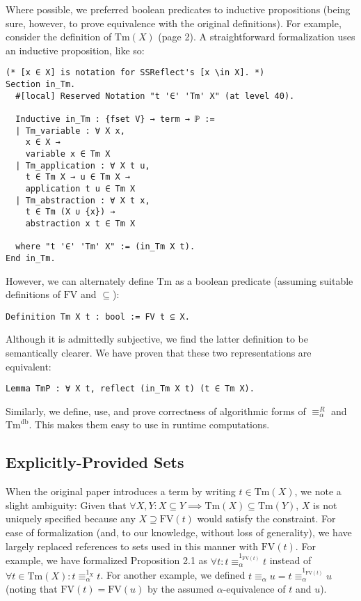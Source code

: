 \documentclass{article}
\begin{document}
Where possible, we preferred boolean predicates to inductive propositions (being sure, however, to
prove equivalence with the original definitions). For example, consider the definition of
$\textrm{Tm}(X)$ (page 2). A straightforward formalization uses an inductive proposition, like so:

\begin{verbatim}
(* [x ∈ X] is notation for SSReflect's [x \in X]. *)
Section in_Tm.
  #[local] Reserved Notation "t '∈' 'Tm' X" (at level 40).

  Inductive in_Tm : {fset V} → term → ℙ :=
  | Tm_variable : ∀ X x,
    x ∈ X →
    variable x ∈ Tm X
  | Tm_application : ∀ X t u,
    t ∈ Tm X → u ∈ Tm X →
    application t u ∈ Tm X
  | Tm_abstraction : ∀ X t x,
    t ∈ Tm (X ∪ {x}) →
    abstraction x t ∈ Tm X

  where "t '∈' 'Tm' X" := (in_Tm X t).
End in_Tm.
\end{verbatim}

However, we can alternately define $\textrm{Tm}$ as a boolean predicate (assuming suitable
definitions of $\textrm{FV}$ and $\subseteq$):

\begin{verbatim}
Definition Tm X t : bool := FV t ⊆ X.
\end{verbatim}

Although it is admittedly subjective, we find the latter definition to be semantically clearer. We
have proven that these two representations are equivalent:

\begin{verbatim}
Lemma TmP : ∀ X t, reflect (in_Tm X t) (t ∈ Tm X).
\end{verbatim}

Similarly, we define, use, and prove correctness of algorithmic forms of $\equiv_\alpha^R$ and
$\textrm{Tm}^{\textrm{db}}$. This makes them easy to use in runtime computations.

\subsection{Explicitly-Provided Sets}

When the original paper introduces a term by writing $t \in \textrm{Tm}(X)$, we note a slight
ambiguity: Given that $\forall X, Y : X \subseteq Y \implies \textrm{Tm}(X) \subseteq
\textrm{Tm}(Y)$, $X$ is not uniquely specified because any $X \supseteq \textrm{FV}(t)$ would
satisfy the constraint. For ease of formalization (and, to our knowledge, without loss of
generality), we have largely replaced references to sets used in this manner with $\textrm{FV}(t)$.
For example, we have formalized Proposition 2.1 as $\forall t : t \equiv_\alpha^{1_{\textrm{FV}(t)}}
t$ instead of $\forall t \in \textrm{Tm}(X) : t \equiv_\alpha^{1_X} t$. For another example, we
defined $t \equiv_\alpha u = t \equiv_\alpha^{1_{\textrm{FV}(t)}} u$ (noting that $\textrm{FV}(t) =
\textrm{FV}(u)$ by the assumed $\alpha$-equivalence of $t$ and $u$).
\end{document}

